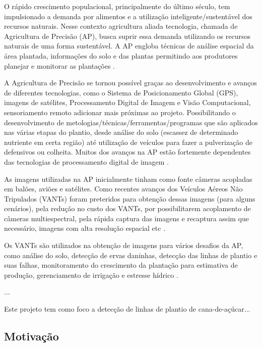 \documentclass[12pt, a4paper, english, brazil]{article}
\newcommand{\textRed}[1]{{{\color{red} #1}}}
\begin{document}
O rápido crescimento populacional, principalmente do último século, tem impulsionado a demanda por alimentos e a utilização inteligente/sustentável dos recursos naturais. Nesse contexto agricultura aliada tecnologia, chamada de Agricultura de Precisão (AP), busca suprir essa demanda utilizando os recursos naturais de uma forma sustentável. A AP engloba técnicas de análise espacial da área plantada, informações do solo e das plantas permitindo aos produtores planejar e monitorar as plantações \cite{Blasch_2020}.

A Agricultura de Precisão se tornou possível graças ao desenvolvimento e avanços de diferentes tecnologias, como o Sistema de Posicionamento Global (GPS), imagens de satélites, Processamento Digital de Imagem e Visão Computacional, sensoriamento remoto \textRed{adicionar mais próximas ao projeto}. Possibilitando o desenvolvimento de metologias/técnicas/ferramentas/programas que são aplicados nas várias etapas do plantio, desde análise do solo (escassez de determinado nutriente em certa região) até utilização de veículos para fazer a pulverização de defensivos ou colheita. \textRed{Muitos dos avanços na AP estão fortemente dependentes das tecnologias de processamento digital de imagem} \cite{Bolfe_2020}.

As imagens utilizadas na AP inicialmente tinham como fonte câmeras acopladas em balões, aviões e satélites. Como recentes avanços dos Veículos Aéreos Não Tripulados (VANTs) foram preteridos para obtenção dessas imagens (para alguns cenários), pela redução no custo dos VANTs, por possibilitarem acoplamento de câmeras multiespectral, pela rápida captura das imagens e recaptura assim que necessário, imagens com alta resolução espacial etc \textRed{\cite{Delavarpour_2021}}.

Os VANTs são utilizados na obtenção de imagens para vários desafios da AP, como análise do solo, detecção de ervas daninhas, detecção das linhas de plantio e suas falhas, monitoramento do crescimento da plantação para estimativa de produção, gerenciamento de irrigação e estresse hídrico \textRed{\cite{Delavarpour_2021}}.

...

Este projeto tem como foco a detecção de linhas de plantio de cana-de-açúcar...

\subsection{Motivação}
\end{document}
